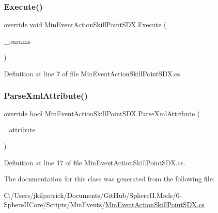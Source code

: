 \subsubsection{\texorpdfstring{Execute()}{Execute()}}
{\footnotesize\ttfamily override void Min\+Event\+Action\+Skill\+Point\+S\+D\+X.\+Execute (\begin{DoxyParamCaption}\item[{Min\+Event\+Params}]{\+\_\+params }\end{DoxyParamCaption})}



Definition at line 7 of file Min\+Event\+Action\+Skill\+Point\+S\+D\+X.\+cs.

\mbox{\label{class_min_event_action_skill_point_s_d_x_a8122846c4ccf722aed8022dfa650bab2}} 
\subsubsection{\texorpdfstring{ParseXmlAttribute()}{ParseXmlAttribute()}}
{\footnotesize\ttfamily override bool Min\+Event\+Action\+Skill\+Point\+S\+D\+X.\+Parse\+Xml\+Attribute (\begin{DoxyParamCaption}\item[{Xml\+Attribute}]{\+\_\+attribute }\end{DoxyParamCaption})}



Definition at line 17 of file Min\+Event\+Action\+Skill\+Point\+S\+D\+X.\+cs.



The documentation for this class was generated from the following file\+:\begin{DoxyCompactItemize}
\item 
C\+:/\+Users/jkilpatrick/\+Documents/\+Git\+Hub/\+Sphere\+I\+I.\+Mods/0-\/\+Sphere\+I\+I\+Core/\+Scripts/\+Min\+Events/\mbox{\hyperlink{_min_event_action_skill_point_s_d_x_8cs}{Min\+Event\+Action\+Skill\+Point\+S\+D\+X.\+cs}}\end{DoxyCompactItemize}
